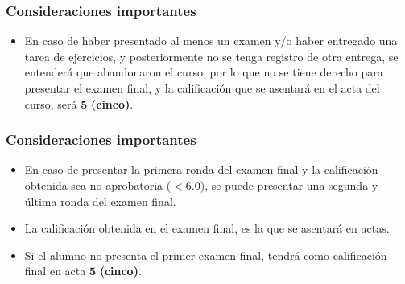 \begin{frame}
\frametitle{Consideraciones importantes}
\begin{itemize}
\setlength{\itemsep}{0mm}
\item En caso de haber presentado al menos un examen y/o haber entregado una tarea de ejercicios, y posteriormente no se tenga registro de otra entrega, se entenderá que abandonaron el curso, por lo que no se tiene derecho para presentar el examen final, y la calificación que se asentará en el acta del curso, será $\mathbf{5}$ \textbf{(cinco)}.
\end{itemize}
\end{frame}
\begin{frame}
\frametitle{Consideraciones importantes}
\begin{itemize}
\setlength{\itemsep}{0mm}
\item En caso de presentar la primera ronda del examen final y la calificación obtenida sea no aprobatoria ($<6.0$), se puede presentar una segunda y última ronda del examen final.
\item La calificación obtenida en el examen final, es la que se asentará en actas.
\item Si el alumno no presenta el primer examen final, tendrá como calificación final en acta $\mathbf{5}$ \textbf{(cinco)}. 
\end{itemize}
\end{frame}
